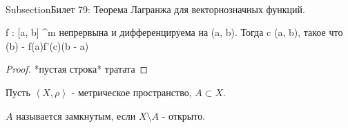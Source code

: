 \\Subsection{Билет 79: Теорема Лагранжа для векторнозначных
функций.}

\begin{theorem} \thmslashn
    
    f : [a, b] \mapsto {}^m непрервына и дифференцируема на  (a, b). Тогда \exists c \in (a, b), такое что \left\Vertf(b) - f(a)\right\Vert \leq \left\Vert f'(c)\right\Vert (b - a)
    \begin{proof} \thmslashn
        *пустая строка*
        тратата
    \end{proof}
\end{theorem}
\begin{definition} \thmslashn 

    Пусть $\left<X, \rho\right>$ - метрическое пространство, $A \subset X$.

    $A$ называется замкнутым, если $X \setminus A$ - открыто. 
\end{definition}
